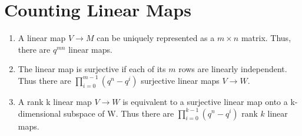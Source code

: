 \documentclass{article}
\begin{document}
\section{Counting Linear Maps}
   \begin{enumerate}
      \item 
         A linear map $V \to M$ can be uniquely represented as a $m \times n$ matrix. 
         Thus, there are $q^{mn}$ linear maps.
      \item 
         The linear map is surjective if each of its $m$ rows are linearly independent.
         Thus there are $\prod_{i=0}^{m-1} (q^n-q^i)$ surjective linear maps $V \to W$.
      \item 
         A rank k linear map $V \to W$ is equivalent to a surjective linear map 
         onto a k-dimensional subspace of W.
         Thus there are $\prod_{i=0}^{k-1} (q^n-q^i)$ rank $k$ linear maps.
   \end{enumerate}
\end{document}
